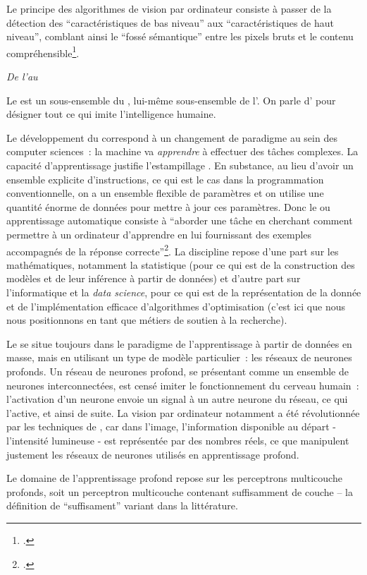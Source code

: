Le principe des algorithmes de vision par ordinateur consiste à passer
de la détection des ``caractéristiques de bas niveau'' aux
``caractéristiques de haut niveau'', comblant ainsi le ``fossé
sémantique'' entre les pixels bruts et le contenu
compréhensible\footcite{klinke_big_2016}.

\emph{De l'\ia au \dl}

Le \dl est un sous-ensemble du \ml,
lui-même sous-ensemble de l'\ia. On parle d'\ia
pour désigner tout ce qui imite l'intelligence humaine.

Le développement du \ml correspond à un changement
de paradigme au sein des computer sciences~: la machine va
\emph{apprendre} à effectuer des tâches complexes. La capacité
d'apprentissage justifie l'estampillage \ia. En substance, au lieu d'avoir
un ensemble explicite d'instructions, ce qui est le cas dans la
programmation conventionnelle, on a un ensemble flexible de paramètres
et on utilise une quantité énorme de données pour mettre à jour ces
paramètres. Donc le \ml ou apprentissage automatique
consiste à ``aborder une tâche en cherchant comment permettre à un
ordinateur d'apprendre en lui fournissant des exemples accompagnés de la
réponse correcte''\footcite[p.3]{charniak_introduction_2021}. La
discipline repose d'une part sur les mathématiques, notamment la
statistique (pour ce qui est de la construction des modèles et de leur
inférence à partir de données) et d'autre part sur l'informatique et la
\emph{data science}, pour ce qui est de la représentation de la donnée
et de l'implémentation efficace d'algorithmes d'optimisation (c'est ici
que nous nous positionnons en tant que métiers de soutien à la
recherche).

Le \dl se situe toujours dans le paradigme de
l'apprentissage à partir de données en masse, mais en utilisant un type de
modèle particulier~: les réseaux de neurones profonds. Un réseau de
neurones profond, se présentant comme un ensemble de neurones
interconnectées, est censé imiter le fonctionnement du cerveau humain~:
l'activation d'un neurone envoie un signal à un autre neurone du réseau,
ce qui l'active, et ainsi de suite. La vision par ordinateur notamment a
été révolutionnée par les techniques de \dl, car dans
l'image, l'information disponible au départ - l'intensité lumineuse -
est représentée par des nombres réels, ce que manipulent justement les
réseaux de neurones utilisés en apprentissage profond.

Le domaine de l'apprentissage profond repose sur les perceptrons
multicouche profonds, soit un perceptron multicouche contenant
suffisamment de couche -- la définition de ``suffisament'' variant dans
la littérature.

